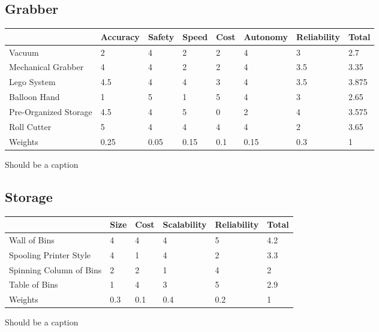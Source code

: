 \documentclass[12pt]{report}
\begin{document}
\subsection*{Grabber}


\begin{minipage}{\linewidth}
\centering
{} \label{tab:grabber} 
\begin{tabular}{|l|l|l|l|l|l|l|l|}
\hline
 & Accuracy & Safety & Speed & Cost & Autonomy & Reliability & Total \\
 \hline
Vacuum & 2 & 4 & 2 & 2 & 4 & 3 & 2.7 \\
Mechanical Grabber & 4 & 4 & 2 & 2 & 4 & 3.5 & 3.35 \\
\rowcolor{green}
Lego System & 4.5 & 4 & 4 & 3 & 4 & 3.5 & 3.875 \\
Balloon Hand & 1 & 5 & 1 & 5 & 4 & 3 & 2.65 \\
Pre-Organized Storage & 4.5 & 4 & 5 & 0 & 2 & 4 & 3.575 \\
Roll Cutter & 5 & 4 & 4 & 4 & 4 & 2 & 3.65 \\
Weights & 0.25 & 0.05 & 0.15 & 0.1 & 0.15 & 0.3 & 1 \\
\hline
\end{tabular}\par
\bigskip
Should be a caption
\end{minipage}


\subsection*{Storage}


\begin{minipage}{\linewidth}
\centering
{} \label{tab:grabber} 
\begin{tabular}{|l|l|l|l|l|l|}
\hline
 & Size & Cost & Scalability & Reliability & Total \\
 \hline
 \rowcolor{green}
Wall of Bins & 4 & 4 & 4 & 5 & 4.2 \\
Spooling Printer Style & 4 & 1 & 4 & 2 & 3.3 \\
Spinning Column of Bins & 2 & 2 & 1 & 4 & 2 \\
Table of Bins & 1 & 4 & 3 & 5 & 2.9 \\
Weights & 0.3 & 0.1 & 0.4 & 0.2 & 1 \\
\hline
\end{tabular}\par
\bigskip
Should be a caption
\end{minipage}
\end{document}
